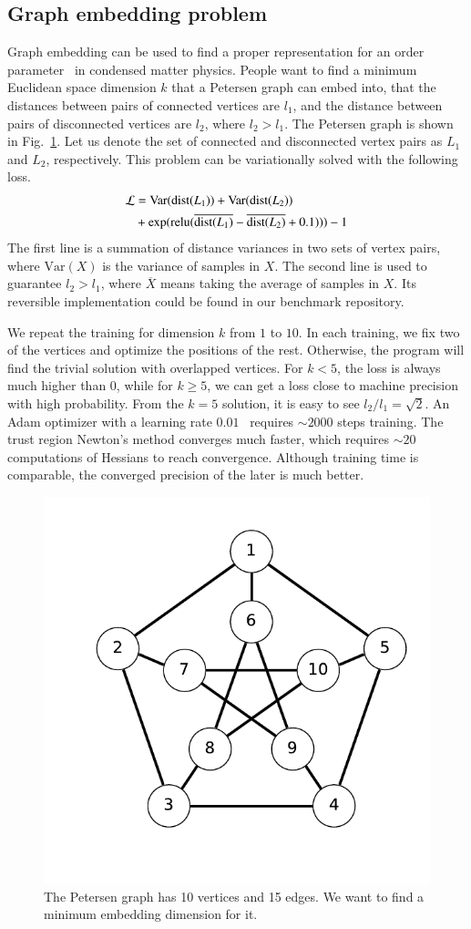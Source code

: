 \documentclass{article}
\newcommand{\<}{\langle}
\renewcommand{\>}{\rangle}
\newcommand{\Var}{{\mathrm{Var}}}
\renewcommand{\cite}[1]{{\citep{#1}}}
\newcommand{\Fig}[1]{Fig.~\ref{#1}}
\theoremstyle{definition}\newtheorem{definition}{\textit{Definition}}
\begin{document}
\subsection{Graph embedding problem}\label{sec:graphbench}
Graph embedding can be used to find a proper representation for an order parameter~\cite{Takahashi2020} in condensed matter physics. People want to find a minimum Euclidean space dimension $k$ that a Petersen graph can embed into, that the distances between pairs of connected vertices are $l_1$, and the distance between pairs of disconnected vertices are $l_2$, where $l_2 > l_1$.
The Petersen graph is shown in \Fig{fig:petersen}.
Let us denote the set of connected and disconnected vertex pairs as $L_1$ and $L_2$, respectively. This problem can be variationally solved with the following loss.
\begin{align}
    \begin{split}
        \mathcal{L} &= \Var({\rm dist}(L_1)) + \Var({\rm dist}(L_2)) \\
        &+\exp({\rm relu}(\overline{{\rm dist}(L_1)} - \overline{{\rm dist}(L_2)} + 0.1))) - 1
    \end{split}
\end{align}
The first line is a summation of distance variances in two sets of vertex pairs, where $\Var(X)$ is the variance of samples in $X$.
The second line is used to guarantee $l_2 > l_1$, where $\overline{X}$ means taking the average of samples in $X$.
Its reversible implementation could be found in our benchmark repository.

We repeat the training for dimension $k$ from $1$ to $10$.
In each training, we fix two of the vertices and optimize the positions of the rest. Otherwise, the program will find the trivial solution with overlapped vertices. 
For $k < 5$, the loss is always much higher than $0$,
while for $k\geq5$, we can get a loss close to machine precision with high probability.
From the $k=5$ solution, it is easy to see $l_2/l_1 = \sqrt{2}$.
An Adam optimizer with a learning rate $0.01$~\cite{Kingma2014} requires $\sim2000$ steps training.
The trust region Newton's method converges much faster, which requires $\sim 20$ computations of Hessians to reach convergence.
Although training time is comparable, the converged precision of the later is much better.
\begin{figure}
    \centerline{\includegraphics[width=0.4\columnwidth,trim={0 1cm 0 0},clip]{petersen.pdf}}
    \caption{The Petersen graph has 10 vertices and 15 edges. We want to find a minimum embedding dimension for it.}\label{fig:petersen}
\end{figure}
\end{document}

